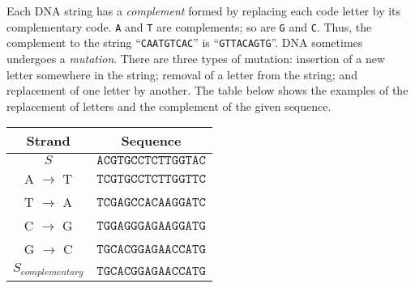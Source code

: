 Each DNA string has a {\em complement} formed by replacing each code letter by its
complementary code. {\tt A} and {\tt T} are complements; so are {\tt G} and 
{\tt C}. Thus, the complement to the string ``{\tt CAATGTCAC}'' is
``{\tt GTTACAGTG}''.
DNA sometimes undergoes a {\em mutation}. There are three types of mutation:
insertion of a new letter somewhere in the string; removal of a letter from the
string; and replacement of one letter by another. The table below shows the examples of the replacement of letters and the complement of the given sequence. 

\begin{center}

\begin{tabular}{|cc|}
\hline
\textbf{Strand} & \textbf{Sequence}\\
\hline\hline
$S$      & $\mathtt{ACGTGCCTCTTGGTAC}$ \\
\hline
A $\to$ T &  $\mathtt{TCGTGCCTCTTGGTTC}$ \\
T $\to$ A &  $\mathtt{TCGAGCCACAAGGATC}$ \\
C $\to$ G &  $\mathtt{TGGAGGGAGAAGGATG}$ \\
G $\to$ C &  $\mathtt{TGCACGGAGAACCATG}$ \\ 
\hline
$S_{complementary}$ &  $\mathtt{TGCACGGAGAACCATG}$ \\
\hline
\end{tabular}
\end{center}

